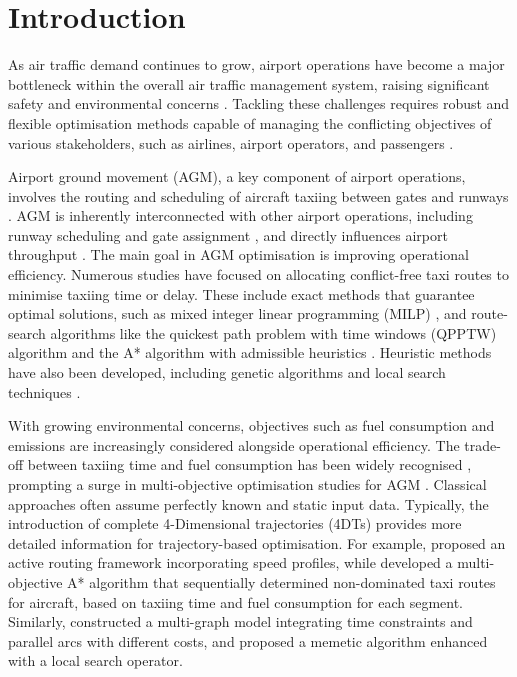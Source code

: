\documentclass{article}
\begin{document}
\section{Introduction}

As air traffic demand continues to grow, airport operations have become a major bottleneck within the overall air traffic management system, raising significant safety and environmental concerns \cite{icao2023}. Tackling these challenges requires robust and flexible optimisation methods capable of managing the conflicting objectives of various stakeholders, such as airlines, airport operators, and passengers \cite{chen2015toward, chen2016toward}.

Airport ground movement (AGM), a key component of airport operations, involves the routing and scheduling of aircraft taxiing between gates and runways \cite{atkin_airport_2010}. AGM is inherently interconnected with other airport operations, including runway scheduling \cite{ikli_aircraft_2021} and gate assignment \cite{das_review_2020}, and directly influences airport throughput \cite{atkin_airport_2010}. The main goal in AGM optimisation is improving operational efficiency. Numerous studies have focused on allocating conflict-free taxi routes to minimise taxiing time or delay. These include exact methods that guarantee optimal solutions, such as mixed integer linear programming (MILP) \cite{roling2008optimal, roling2009airport, clare2011optimization}, and route-search algorithms like the quickest path problem with time windows (QPPTW) algorithm \cite{ravizza2014more} and the A* algorithm with admissible heuristics \cite{dabachine2018bidirectional}. Heuristic methods have also been developed, including genetic algorithms \cite{garcia2002planning, gotteland2003handling, gotteland2003genetic, garcia2005optimization, brownlee2018rolling} and local search techniques \cite{ravizza2014more, adacher2018airport}.

With growing environmental concerns, objectives such as fuel consumption and emissions are increasingly considered alongside operational efficiency. The trade-off between taxiing time and fuel consumption has been widely recognised \cite{ravizza2013trade}, prompting a surge in multi-objective optimisation studies for AGM \cite{weiszer2014heuristic, weiszer2015real, chen2015toward, chen2016toward, weiszer2020multi, beke2023routing}. Classical approaches often assume perfectly known and static input data. Typically, the introduction of complete 4-Dimensional trajectories (4DTs) provides more detailed information for trajectory-based optimisation. For example, \cite{chen2015toward, chen2016toward} proposed an active routing framework incorporating speed profiles, while \cite{weiszer2020multi} developed a multi-objective A* algorithm that sequentially determined non-dominated taxi routes for aircraft, based on taxiing time and fuel consumption for each segment. Similarly, \cite{beke2023routing} constructed a multi-graph model integrating time constraints and parallel arcs with different costs, and proposed a memetic algorithm enhanced with a local search operator.
\end{document}

